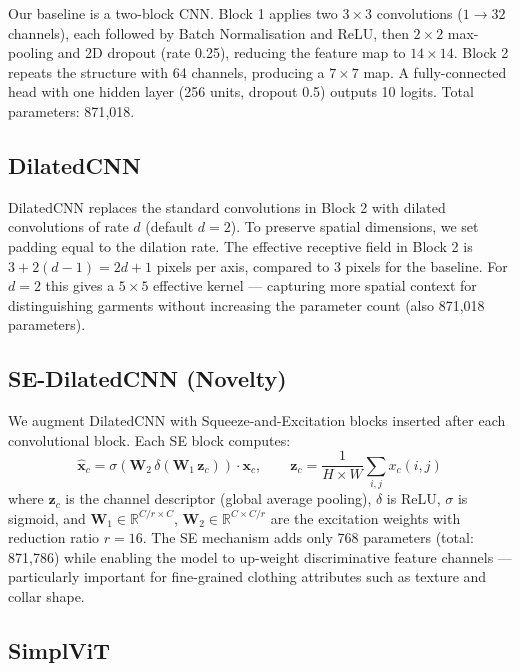 \documentclass[10pt,a4paper]{article}
\begin{document}
Our baseline is a two-block CNN.
Block 1 applies two $3\!\times\!3$ convolutions ($1\!\to\!32$ channels), each followed by Batch Normalisation and ReLU, then $2\!\times\!2$ max-pooling and 2D dropout (rate 0.25), reducing the feature map to $14\!\times\!14$.
Block 2 repeats the structure with 64 channels, producing a $7\!\times\!7$ map.
A fully-connected head with one hidden layer (256 units, dropout 0.5) outputs 10 logits.
Total parameters: 871{,}018.

\subsection{DilatedCNN}

DilatedCNN replaces the standard convolutions in Block 2 with dilated convolutions of rate $d$ (default $d=2$).
To preserve spatial dimensions, we set padding equal to the dilation rate.
The effective receptive field in Block 2 is $3 + 2(d-1) = 2d+1$ pixels per axis, compared to 3 pixels for the baseline.
For $d=2$ this gives a $5\!\times\!5$ effective kernel — capturing more spatial context for distinguishing garments without increasing the parameter count (also 871{,}018 parameters).

\subsection{SE-DilatedCNN (Novelty)}
\label{sec:se}

We augment DilatedCNN with Squeeze-and-Excitation blocks \cite{senet} inserted after each convolutional block.
Each SE block computes:
\begin{equation}
  \hat{\mathbf{x}}_c = \sigma\!\left(\mathbf{W}_2\,\delta\!\left(\mathbf{W}_1\,\mathbf{z}_c\right)\right) \cdot \mathbf{x}_c,
  \qquad \mathbf{z}_c = \frac{1}{H{\times}W}\sum_{i,j} x_c(i,j)
\end{equation}
where $\mathbf{z}_c$ is the channel descriptor (global average pooling), $\delta$ is ReLU, $\sigma$ is sigmoid, and $\mathbf{W}_1 \in \mathbb{R}^{C/r \times C}$, $\mathbf{W}_2 \in \mathbb{R}^{C \times C/r}$ are the excitation weights with reduction ratio $r=16$.
The SE mechanism adds only 768 parameters (total: 871{,}786) while enabling the model to up-weight discriminative feature channels — particularly important for fine-grained clothing attributes such as texture and collar shape.

\subsection{SimplViT}
\end{document}
